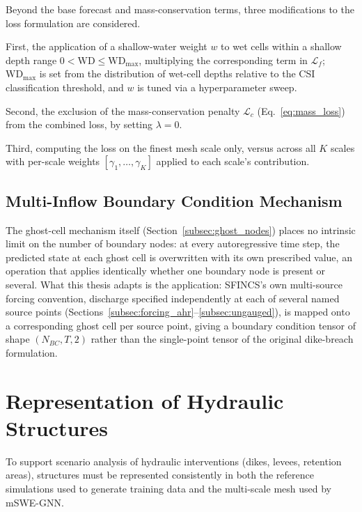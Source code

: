 \documentclass[12pt,a4paper]{report}
\begin{document}
Beyond the base forecast and mass-conservation terms, three modifications to the
loss formulation are considered. 

First, the application of a shallow-water weight
$w$ to wet cells within a shallow depth range $0 < \text{WD} \le \text{WD}_\text{max}$,
multiplying the corresponding term in $\mathcal{L}_f$; $\text{WD}_\text{max}$ is
set from the distribution of wet-cell depths relative to the CSI classification
threshold, and $w$ is tuned via a hyperparameter sweep. 

Second, the exclusion of
the mass-conservation penalty $\mathcal{L}_c$ (Eq.~\ref{eq:mass_loss}) from the
combined loss, by setting $\lambda = 0$. 

Third, computing the loss on the finest
mesh scale only, versus across all $K$ scales with per-scale weights
$[\gamma_1, \ldots, \gamma_K]$ applied to each scale's contribution. 
 
\subsection{Multi-Inflow Boundary Condition Mechanism}
\label{subsec:model_adaptation_detail}
 
The ghost-cell mechanism itself (Section~\ref{subsec:ghost_nodes}) places no
intrinsic limit on the number of boundary nodes: at every autoregressive time step,
the predicted state at each ghost cell is overwritten with its own prescribed
value, an operation that applies identically whether one boundary node is present
or several. What this thesis adapts is the application: SFINCS's
own multi-source forcing convention, discharge specified independently at each of
several named source points (Sections~\ref{subsec:forcing_ahr}--\ref{subsec:ungauged}), is mapped onto a corresponding ghost cell per source point, giving a boundary
condition tensor of shape $(N_{BC}, T, 2)$ rather than the single-point tensor of
the original dike-breach formulation.
 
\section{Representation of Hydraulic Structures}
\label{sec:hydraulic_structures_method}
 
To support scenario analysis of hydraulic interventions (dikes, levees, retention
areas), structures must be represented consistently in both the reference simulations
used to generate training data and the multi-scale mesh used by mSWE-GNN.
 
\end{document}
